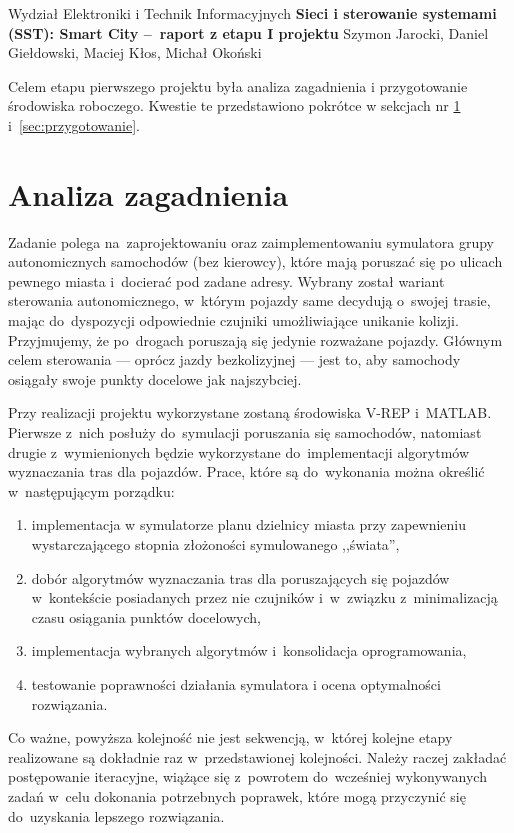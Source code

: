 \documentclass[11pt, a4paper, twoside]{article}
\begin{document}
	
	\begin{center} 
		{\Large Wydział Elektroniki i Technik Informacyjnych}
		\vskip0.2cm
		{\LARGE \textbf{Sieci i sterowanie systemami (SST): Smart City --~raport z etapu I projektu  } } 
		\vskip0.3cm
		{\Large Szymon Jarocki, Daniel Giełdowski, Maciej Kłos, Michał Okoński}
		\vskip0.8cm
	\end{center} 
	
	Celem etapu pierwszego projektu była analiza zagadnienia i przygotowanie środowiska roboczego. Kwestie te przedstawiono pokrótce w sekcjach nr \ref{sec:analiza} i~\ref{sec:przygotowanie}.	
	
	\section{Analiza zagadnienia}
	\label{sec:analiza}
	Zadanie polega na~zaprojektowaniu oraz zaimplementowaniu symulatora grupy autonomicznych samochodów (bez kierowcy), które mają poruszać się po ulicach pewnego miasta i~docierać pod zadane adresy. Wybrany został wariant sterowania autonomicznego, w~którym pojazdy same decydują o~swojej trasie, mając do~dyspozycji odpowiednie czujniki umożliwiające unikanie kolizji. Przyjmujemy, że po~drogach poruszają się jedynie rozważane pojazdy. Głównym celem sterowania --- oprócz jazdy bezkolizyjnej --- jest to, aby samochody osiągały swoje punkty docelowe jak najszybciej.
	
	Przy realizacji projektu wykorzystane zostaną środowiska V-REP i~MATLAB. Pierwsze z~nich posłuży do~symulacji poruszania się samochodów, natomiast drugie z~wymienionych będzie wykorzystane do~implementacji algorytmów wyznaczania tras dla pojazdów. Prace, które są do~wykonania można określić w~następującym porządku:
	\begin{enumerate}[1)]
		\item implementacja w symulatorze planu dzielnicy miasta przy zapewnieniu wystarczającego stopnia złożoności symulowanego ,,świata'',
		\item dobór algorytmów wyznaczania tras dla poruszających się pojazdów w~kontekście posiadanych przez nie czujników i~w~związku z~minimalizacją czasu osiągania punktów docelowych,
		\item implementacja wybranych algorytmów i~konsolidacja oprogramowania,
		\item testowanie poprawności działania symulatora i ocena optymalności rozwiązania.
	\end{enumerate}
	Co ważne, powyższa kolejność nie jest sekwencją, w~której kolejne etapy realizowane są dokładnie raz w~przedstawionej kolejności. Należy raczej zakładać postępowanie iteracyjne, wiążące się z~powrotem do~wcześniej wykonywanych zadań w~celu dokonania potrzebnych poprawek, które mogą przyczynić się do~uzyskania lepszego rozwiązania.
	
\end{document}
